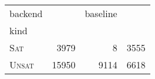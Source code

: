 \begin{tabular}{lrrr}
\toprule
backend & \Calculus{} & baseline & \Nuxmv{} \\
kind &  &  &  \\
\midrule
\textsc{Sat} & 3979 & 8 & 3555 \\
\textsc{Unsat} & 15950 & 9114 & 6618 \\
\bottomrule
\end{tabular}
